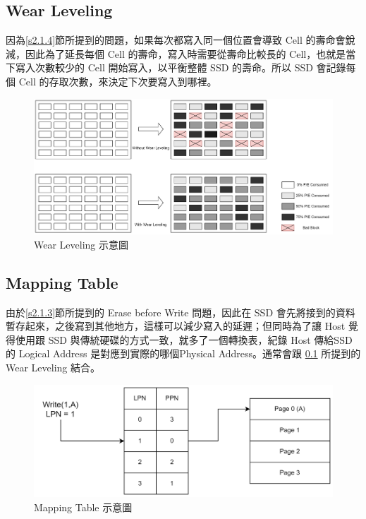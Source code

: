 \subsection{Wear Leveling}\label{s2.2.1}
\indent
因為\ref{s2.1.4}節所提到的問題，如果每次都寫入同一個位置會導致 Cell 的壽命會銳減，因此為了延長每個 Cell 的壽命，寫入時需要從壽命比較長的 Cell，也就是當下寫入次數較少的 Cell 開始寫入，以平衡整體 SSD 的壽命。所以 SSD 會記錄每個 Cell 的存取次數，來決定下次要寫入到哪裡。\cite{Wear_Leveling_Thesis}
\begin{figure}[H]
    \centering
    \includegraphics[width=1\textwidth]{picture/ch2/Wear_Leveling.png}
    \caption{Wear Leveling 示意圖\cite{Wear_Leveling_Pic}}
    \label{f2.5}
\end{figure}

\subsection{Mapping Table}\label{s2.2.2}
\indent
由於\ref{s2.1.3}節所提到的 Erase before Write 問題，因此在 SSD 會先將接到的資料暫存起來，之後寫到其他地方，這樣可以減少寫入的延遲；但同時為了讓 Host 覺得使用跟 SSD 與傳統硬碟的方式一致，就多了一個轉換表，紀錄 Host 傳給SSD的 Logical Address 是對應到實際的哪個Physical Address。通常會跟 \ref{s2.2.1} 所提到的 Wear Leveling 結合。
\begin{figure}[H]
    \centering
    \includegraphics[width=1\textwidth]{picture/ch2/mapping_table.png}
    \caption{Mapping Table 示意圖\cite{Mapping_Table}}
    \label{f2.6}
\end{figure}

